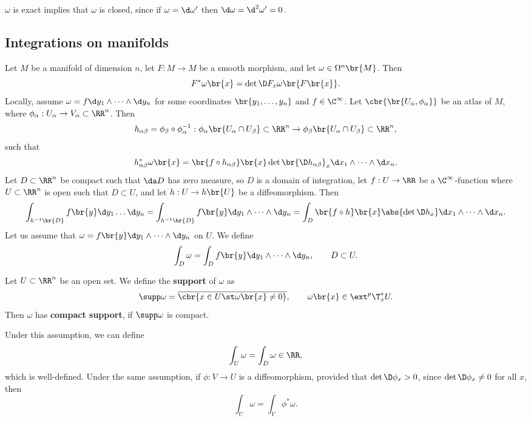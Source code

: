 $ \omega $ is exact implies that $ \omega $ is closed, since if $ \omega = \d\omega' $ then $ \d\omega = \d^2\omega' = 0 $.

\subsection{Integrations on manifolds}

Let $ M $ be a manifold of dimension $ n $, let $ F : M \to M $ be a smooth morphism, and let $ \omega \in \Omega^n\br{M} $. Then
$$ F^*\omega\br{x} = \det \D F_x\omega\br{F\br{x}}. $$
Locally, assume $ \omega = f\d y_1 \wedge \dots \wedge \d y_n $ for some coordinates $ \br{y_1, \dots, y_n} $ and $ f \in \C^\infty $. Let $ \cbr{\br{U_\alpha, \phi_\alpha}} $ be an atlas of $ M $, where $ \phi_\alpha : U_\alpha \to V_\alpha \subset \RR^n $. Then
$$ h_{\alpha\beta} = \phi_\beta \circ \phi_\alpha^{-1} : \phi_\alpha\br{U_\alpha \cap U_\beta} \subset \RR^n \to \phi_\beta\br{U_\alpha \cap U_\beta} \subset \RR^n, $$
such that
$$ h_{\alpha\beta}^*\omega\br{x} = \br{f \circ h_{\alpha\beta}}\br{x}\det \br{\D h_{\alpha\beta}}_x\d x_1 \wedge \dots \wedge \d x_n. $$
Let $ D \subset \RR^n $ be compact such that $ \da D $ has zero measure, so $ D $ is a domain of integration, let $ f : U \to \RR $ be a $ \C^\infty $-function where $ U \subset \RR^n $ is open such that $ D \subset U $, and let $ h : U \to h\br{U} $ be a diffeomorphism. Then
$$ \int_{h^{-1}\br{D}} f\br{y}\d y_1 \dots \d y_n = \int_{h^{-1}\br{D}} f\br{y}\d y_1 \wedge \dots \wedge \d y_n = \int_{D} \br{f \circ h}\br{x}\abs{\det \D h_x}\d x_1 \wedge \dots \wedge \d x_n. $$
Let us assume that $ \omega = f\br{y}\d y_1 \wedge \dots \wedge \d y_n $ on $ U $. We define
$$ \int_D \omega = \int_D f\br{y}\d y_1 \wedge \dots \wedge \d y_n, \qquad D \subset U. $$

\begin{definition}
Let $ U \subset \RR^n $ be an open set. We define the \textbf{support} of $ \omega $ as
$$ \supp \omega = \overline{\cbr{x \in U \st \omega\br{x} \ne 0}}, \qquad \omega\br{x} \in \ext^p\T_x^*U. $$
Then $ \omega $ has \textbf{compact support}, if $ \supp \omega $ is compact.
\end{definition}

\begin{fact*}
Under this assumption, we can define
$$ \int_U \omega = \int_D \omega \in \RR, $$
which is well-defined. Under the same assumption, if $ \phi : V \to U $ is a diffeomorphism, provided that $ \det \D\phi_x > 0 $, since $ \det \D\phi_x \ne 0 $ for all $ x $, then
$$ \int_U \omega = \int_V \phi^*\omega. $$
\end{fact*}

